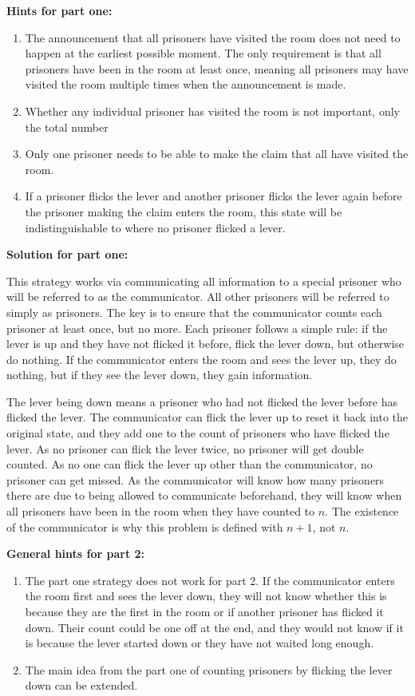 \textbf{Hints for part one:}

\begin{enumerate}
	\item The announcement that all prisoners have visited the room does not need to happen at the earliest possible moment. The only requirement is that all prisoners have been in the room at least once, meaning all prisoners may have visited the room multiple times when the announcement is made.
	\item Whether any individual prisoner has visited the room is not important, only the total number
	\item Only one prisoner needs to be able to make the claim that all have visited the room.
	\item If a prisoner flicks the lever and another prisoner flicks the lever again before the prisoner making the claim enters the room, this state will be indistinguishable to where no prisoner flicked a lever.
\end{enumerate}

\textbf{Solution for part one:}

This strategy works via communicating all information to a special prisoner who will be referred to as the communicator. All other prisoners will be referred to simply as prisoners. The key is to ensure that the communicator counts each prisoner at least once, but no more. Each prisoner follows a simple rule: if the lever is up and they have not flicked it before, flick the lever down, but otherwise do nothing. If the communicator enters the room and sees the lever up, they do nothing, but if they see the lever down, they gain information.

The lever being down means a prisoner who had not flicked the lever before has flicked the lever. The communicator can flick the lever up to reset it back into the original state, and they add one to the count of prisoners who have flicked the lever. As no prisoner can flick the lever twice, no prisoner will get double counted. As no one can flick the lever up other than the communicator, no prisoner can get missed. As the communicator will know how many prisoners there are due to being allowed to communicate beforehand, they will know when all prisoners have been in the room when they have counted to $n$. The existence of the communicator is why this problem is defined with $n + 1$, not $n$.

\textbf{General hints for part 2:}

\begin{enumerate}
	\item The part one strategy does not work for part 2. If the communicator enters the room first and sees the lever down, they will not know whether this is because they are the first in the room or if another prisoner has flicked it down. Their count could be one off at the end, and they would not know if it is because the lever started down or they have not waited long enough.
	\item The main idea from the part one of counting prisoners by flicking the lever down can be extended.
\end{enumerate}

